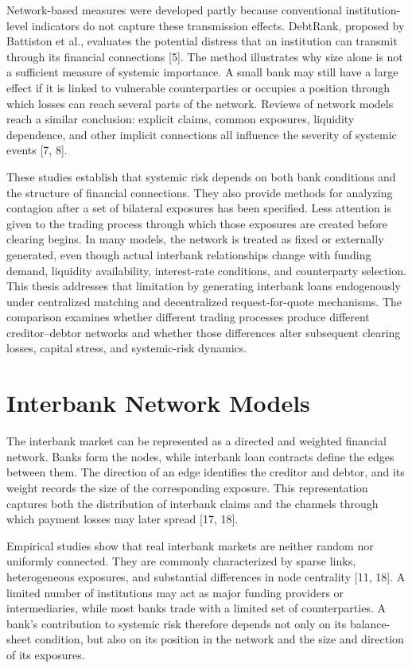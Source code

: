 Network-based measures were developed partly because conventional
institution-level indicators do not capture these transmission effects.
DebtRank, proposed by Battiston et al., evaluates the potential distress
that an institution can transmit through its financial connections
{[}5{]}. The method illustrates why size alone is not a sufficient
measure of systemic importance. A small bank may still have a large
effect if it is linked to vulnerable counterparties or occupies a
position through which losses can reach several parts of the network.
Reviews of network models reach a similar conclusion: explicit claims,
common exposures, liquidity dependence, and other implicit connections
all influence the severity of systemic events {[}7, 8{]}.

These studies establish that systemic risk depends on both bank
conditions and the structure of financial connections. They also provide
methods for analyzing contagion after a set of bilateral exposures has
been specified. Less attention is given to the trading process through
which those exposures are created before clearing begins. In many
models, the network is treated as fixed or externally generated, even
though actual interbank relationships change with funding demand,
liquidity availability, interest-rate conditions, and counterparty
selection. This thesis addresses that limitation by generating interbank
loans endogenously under centralized matching and decentralized
request-for-quote mechanisms. The comparison examines whether different
trading processes produce different creditor--debtor networks and
whether those differences alter subsequent clearing losses, capital
stress, and systemic-risk dynamics.

\section{Interbank Network Models}

The interbank market can be represented as a directed and weighted
financial network. Banks form the nodes, while interbank loan contracts
define the edges between them. The direction of an edge identifies the
creditor and debtor, and its weight records the size of the
corresponding exposure. This representation captures both the
distribution of interbank claims and the channels through which payment
losses may later spread {[}17, 18{]}.

Empirical studies show that real interbank markets are neither random
nor uniformly connected. They are commonly characterized by sparse
links, heterogeneous exposures, and substantial differences in node
centrality {[}11, 18{]}. A limited number of institutions may act as
major funding providers or intermediaries, while most banks trade with a
limited set of counterparties. A bank's contribution to systemic risk
therefore depends not only on its balance-sheet condition, but also on
its position in the network and the size and direction of its exposures.

